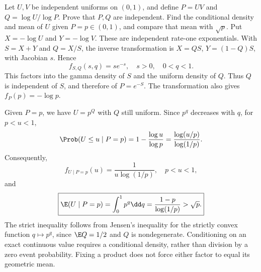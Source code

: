 Let $U,V$ be independent uniforms on $(0,1)$, and define $P=UV$ and $Q=\log U/\log P$. Prove that $P,Q$ are independent. Find the conditional density and mean of $U$ given $P=p\in(0,1)$, and compare that mean with $\sqrt p$.
\solution Put $X=-\log U$ and $Y=-\log V$. These are independent rate-one exponentials. With $S=X+Y$ and $Q=X/S$, the inverse transformation is $X=QS$, $Y=(1-Q)S$, with Jacobian $s$. Hence
\[
f_{S,Q}(s,q)=s e^{-s},\quad s>0,\quad0<q<1.
\]
This factors into the gamma density of $S$ and the uniform density of $Q$. Thus $Q$ is independent of $S$, and therefore of $P=e^{-S}$. The transformation also gives $f_P(p)=-\log p$.

Given $P=p$, we have $U=p^Q$ with $Q$ still uniform. Since $p^q$ decreases with $q$, for $p<u<1$,
\[
\Prob(U\le u\mid P=p)=1-\frac{\log u}{\log p}
=\frac{\log(u/p)}{\log(1/p)}.
\]
Consequently,
\[
\boxed{f_{U\mid P=p}(u)=\frac1{u\log(1/p)},\quad p<u<1,}
\]
and
\[
\boxed{\E(U\mid P=p)=\int_0^1p^q\dd q
=\frac{1-p}{\log(1/p)}>\sqrt p.}
\]
The strict inequality follows from Jensen's inequality for the strictly convex function $q\mapsto p^q$, since $\E Q=1/2$ and $Q$ is nondegenerate.
\pitfall Conditioning on an exact continuous value requires a conditional density, rather than division by a zero event probability. Fixing a product does not force either factor to equal its geometric mean.

